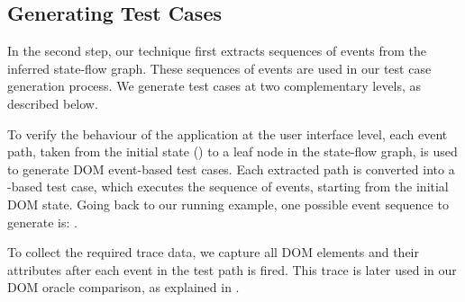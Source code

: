 \subsection{Generating Test Cases}
\label{Sec:testCaseGen}

In the second step, our technique first extracts sequences of events from the inferred state-flow graph. These sequences of events are used in our test case generation process.
We generate test cases at two complementary levels, as described below. %


To verify the behaviour of the application at the user interface level, each event path, taken from the initial state () to a leaf node in the state-flow graph, is used to generate DOM event-based test cases. 
Each extracted path is converted into a \junit \selenium-based test case, which executes the sequence of events, starting from the initial DOM state. %
Going back to our running example, one possible event sequence to generate is: . 

To collect the required trace data, we capture all DOM elements and their attributes after each event in the test path is fired. This trace is later used in our DOM oracle comparison, as explained in . 

